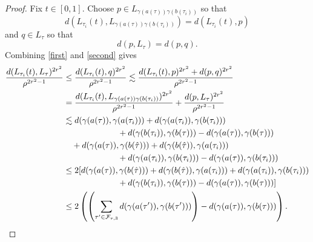 \documentclass[11pt]{amsart}
\theoremstyle{definition}
\numberwithin{theorem}{section} \numberwithin{equation}{section}
\begin{document}
\begin{proof}
Fix $t \in [0,1]$.
Choose $p \in L_{\gamma(a(\tau)) \gamma(b(\tau_i))}$ so that
$$
d(L_{\tau_i}(t),L_{\gamma(a(\tau)) \gamma(b(\tau_i))}) = d(L_{\tau_i}(t),p)
$$
and $q \in L_{\tau}$ so that
$$
d(p,L_{\tau}) = d(p,q).
$$
Combining \eqref{first} and \eqref{second} gives
\begin{align*}
\frac{d(L_{\tau_i}(t),L_{\tau})^{2r^2}}{\rho^{2r^2-1}} 
&\leq \frac{d(L_{\tau_i}(t),q)^{2r^2}}{\rho^{2r^2-1}} 
\lesssim \frac{d(L_{\tau_i}(t),p)^{2r^2} 
+ d(p,q)^{2r^2}}{\rho^{2r^2-1}}\\
&= \frac{d(L_{\tau_i}(t),L_{\gamma(a(\tau)) \gamma(b(\tau_i))})^{2r^2}}{\rho^{2r^2-1}} 
+ \frac{d(p,L_{\tau})^{2r^2}}{\rho^{2r^2-1}}\\
&\lesssim d(\gamma(a(\tau)), \gamma(a(\tau_i))) + d(\gamma(a(\tau_i)), \gamma(b(\tau_i))) \\
&\hspace{.9in} + d(\gamma(b(\tau_i)), \gamma(b(\tau))) -  d(\gamma(a(\tau)), \gamma(b(\tau))) \\
&\quad + d(\gamma(a(\tau)), \gamma(b(\hat{\tau}))) + d(\gamma(b(\hat{\tau})), \gamma(a(\tau_i))) \\
&\hspace{.9in} + d(\gamma(a(\tau_i)), \gamma(b(\tau_i))) -  d(\gamma(a(\tau)), \gamma(b(\tau_i))) \\
&\leq 2[d(\gamma(a(\tau)), \gamma(b(\hat{\tau}))) + d(\gamma(b(\hat{\tau})), \gamma(a(\tau_i))) + d(\gamma(a(\tau_i)), \gamma(b(\tau_i))) \\
&\hspace{.9in} + d(\gamma(b(\tau_i)), \gamma(b(\tau))) -  d(\gamma(a(\tau)), \gamma(b(\tau)))] \\
&\leq 2 \left( \left( \sum_{\tau' \in \mathcal{F}_{\tau,3}} d(\gamma(a(\tau')),\gamma(b(\tau'))) \right) - d(\gamma(a(\tau)),\gamma(b(\tau))) \right).
\end{align*}


\end{proof}
\end{document}
